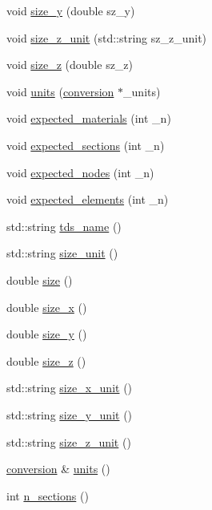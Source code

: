 \begin{DoxyCompactItemize}
\item 
void \hyperlink{classtds_a6213f1a947af9cf29d9d5d3865c02e8a}{size\-\_\-y} (double sz\-\_\-y)
\item 
void \hyperlink{classtds_a7a186b50510083c08285e467639db473}{size\-\_\-z\-\_\-unit} (std\-::string sz\-\_\-z\-\_\-unit)
\item 
void \hyperlink{classtds_a5df14e86f3b2ff4274dece7a42ed180b}{size\-\_\-z} (double sz\-\_\-z)
\item 
void \hyperlink{classtds_a409373885148ce6ee4205bf70f50d1e0}{units} (\hyperlink{classconversion}{conversion} $\ast$\-\_\-units)
\item 
void \hyperlink{classtds_a3e14535665f64a6767fe9f1895fcb46f}{expected\-\_\-materials} (int \-\_\-n)
\item 
void \hyperlink{classtds_a1648fa94e6b568f8a7fff734bef9c241}{expected\-\_\-sections} (int \-\_\-n)
\item 
void \hyperlink{classtds_a110a9b6d50811d675939c052570ac5a4}{expected\-\_\-nodes} (int \-\_\-n)
\item 
void \hyperlink{classtds_ab7533d7fdd94c188829812b470901e8b}{expected\-\_\-elements} (int \-\_\-n)
\item 
std\-::string \hyperlink{classtds_ad22bbd85e2113e86a31748b8a3416f48}{tds\-\_\-name} ()
\item 
std\-::string \hyperlink{classtds_ad1ddd92c4310315e98f811dd60efb7ac}{size\-\_\-unit} ()
\item 
double \hyperlink{classtds_a4c2d47950b0d7ee330c0c855aa6e52bd}{size} ()
\item 
double \hyperlink{classtds_a71a52f8dd2a39013853d60da85d5ba24}{size\-\_\-x} ()
\item 
double \hyperlink{classtds_a2ff73e167e7eed3a980213fb81b40ef8}{size\-\_\-y} ()
\item 
double \hyperlink{classtds_ad14edbd179004b670d371d8660b1b486}{size\-\_\-z} ()
\item 
std\-::string \hyperlink{classtds_a4f6d879a0cd31e65a760587945fd9009}{size\-\_\-x\-\_\-unit} ()
\item 
std\-::string \hyperlink{classtds_a0589d2ae127297bd3a81159b1e519212}{size\-\_\-y\-\_\-unit} ()
\item 
std\-::string \hyperlink{classtds_ac86b2ed48f3ac409ab1c760b1004a272}{size\-\_\-z\-\_\-unit} ()
\item 
\hyperlink{classconversion}{conversion} \& \hyperlink{classtds_ac3fb5f95974b18aba2d52c36d947c9f7}{units} ()
\item 
int \hyperlink{classtds_a073ce9850518f54ea9a5f2fad1f70d36}{n\-\_\-sections} ()

\end{DoxyCompactItemize}
